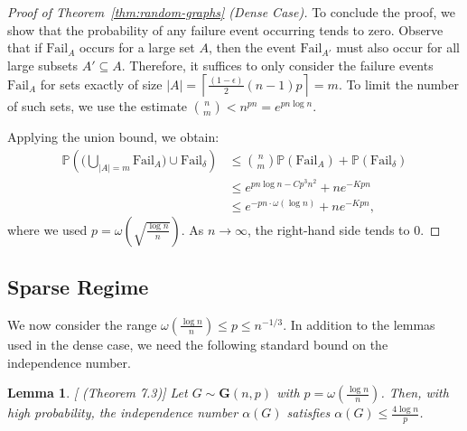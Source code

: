 \documentclass[12pt,UKenglish]{amsart}
\theoremstyle{plain}
\newtheorem{lemma}[thm]{Lemma}
\theoremstyle{definition}
\theoremstyle{remark}
\begin{document}
\begin{proof}[Proof of Theorem~\ref{thm:random-graphs} (Dense Case)]
To conclude the proof, we show that the probability of any failure event occurring tends to zero. Observe that if $\text{Fail}_A$ occurs for a large set $A$, then the event $\text{Fail}_{A'}$ must also occur for all large subsets $A'\subseteq A$. Therefore, it suffices to only consider the failure events $\text{Fail}_A$ for sets exactly of size $|A|=\left\lceil \frac{(1-\epsilon)}{2}(n-1)p \right\rceil= m$. To limit the number of such sets, we use the estimate $\binom{n}{m} < n^{pn} = e^{pn \log n}$. 

Applying the union bound, we obtain:
\begin{align*}
  \mathbb{P}\left(\big(\bigcup_{|A|=m}\text{Fail}_A\big)\cup \text{Fail}_{\delta}\right) &\le \binom{n}{m}\mathbb{P}(\text{Fail}_A) + \mathbb{P}(\text{Fail}_\delta) \\
  &\le e^{pn \log n - C p^3n^2} + ne^{-Kpn} \\
  &\le e^{-pn \cdot\omega(\log n)} + ne^{-Kpn},
\end{align*}
where we used $p=\omega\left(\sqrt{\frac{\log n}{n}}\right)$. As $n\rightarrow\infty$, the right-hand side tends to $0$.
 \end{proof}
\subsection{Sparse Regime}
We now consider the range $\omega\left(\frac{\log n}{n}\right) \le p \le n^{-1/3}$. In addition to the lemmas used in the dense case, we need the following standard bound on the independence number.

\begin{lemma} \label{lem:independence-number}[\cite{FriezeKaronski2015} (Theorem 7.3)]
Let $G \sim \mathbf{G}(n,p)$ with $p = \omega\left(\frac{\log n}{n}\right)$. Then, with high probability, the independence number $\alpha(G)$ satisfies $\alpha(G) \le \frac{4 \log n}{p}$.
\end{lemma}
\end{document}
